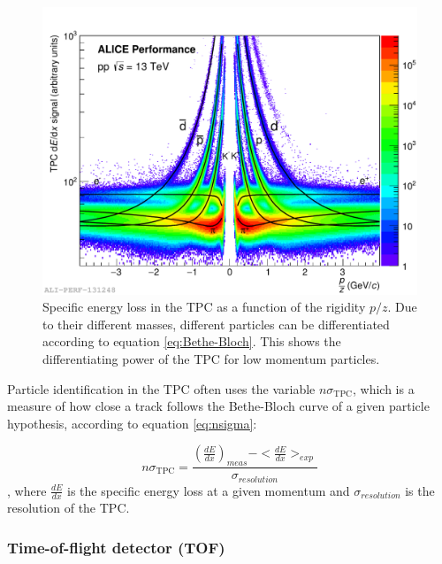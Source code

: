 \begin{figure}
    \centering
    \includegraphics[width=\textwidth]{figures/Ali_TPC_performance_pp.pdf}
    \caption{Specific energy loss in the TPC as a function of the rigidity $p/z$. Due to their different masses, different particles can be differentiated according to equation \ref{eq:Bethe-Bloch}. This shows the differentiating power of the TPC for low momentum particles.}
    \label{fig:PID_TPC}
\end{figure}

Particle identification in the TPC often uses the variable $n\sigma_{\mathrm{TPC}}$, which is a measure of how close a track follows the Bethe-Bloch curve of a given particle hypothesis, according to equation \ref{eq:nsigma}:

\begin{equation}\label{eq:nsigma}
    n\sigma_{\mathrm{TPC}} = \frac{(\frac{dE}{dx})_{meas} - <\frac{dE}{dx}>_{exp}}{\sigma_{resolution}}
\end{equation}
, where $\frac{dE}{dx}$ is the specific energy loss at a given momentum and $\sigma_{resolution}$ is the resolution of the TPC. 

\subsubsection{Time-of-flight detector (TOF)}

